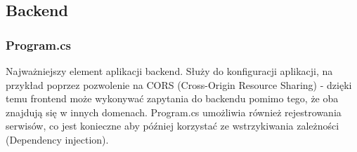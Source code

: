\tocless\subsection{Backend}

\tocless\subsubsection{Program.cs}

Najważniejszy element aplikacji backend. Służy do konfiguracji aplikacji, na przykład poprzez pozwolenie na CORS (Cross-Origin Resource Sharing) - dzięki temu frontend może wykonywać zapytania do backendu pomimo tego, że oba znajdują się w innych domenach. Program.cs umożliwia również rejestrowania serwisów, co jest konieczne aby później korzystać ze wstrzykiwania zależności (Dependency injection). 

